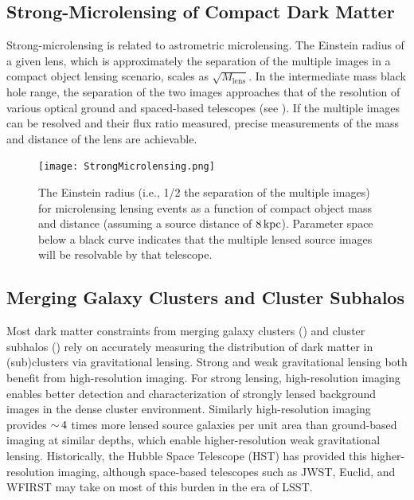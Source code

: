 \subsection{Strong-Microlensing of Compact Dark Matter }
Strong-microlensing is related to astrometric microlensing.
The Einstein radius of a given lens, which is approximately the separation of the multiple images in a compact object lensing scenario, scales as $\sqrt{M_\mathrm{lens}}$.
In the intermediate mass black hole range, the separation of the two images approaches that of the resolution of various optical ground and spaced-based telescopes (see ).
If the multiple images can be resolved and their flux ratio measured, precise measurements of the mass and distance of the lens are achievable.

\begin{figure}
\label{fig:strong_microlensing}
\centering
\texttt{[image: StrongMicrolensing.png]}
\caption{The Einstein radius (i.e., 1/2 the separation of the multiple images) for microlensing lensing events as a function of compact object mass and distance (assuming a source distance of $8\mathrm{\,kpc}$). Parameter space below a black curve indicates that the multiple lensed source images will be resolvable by that telescope.}
\end{figure}

\subsection{Merging Galaxy Clusters and Cluster Subhalos}

Most dark matter constraints from merging galaxy clusters () and cluster subhalos () rely on accurately measuring the distribution of dark matter in (sub)clusters via gravitational lensing.
Strong and weak gravitational lensing both benefit from high-resolution imaging.
For strong lensing, high-resolution imaging enables better detection and characterization of strongly lensed background images in the dense cluster environment.
Similarly high-resolution imaging provides $ {\sim}\,4$ times more lensed source galaxies per unit area than ground-based imaging at similar depths, which enable higher-resolution weak gravitational lensing.
Historically, the Hubble Space Telescope (HST) has provided this higher-resolution imaging, although space-based telescopes such as JWST, Euclid, and WFIRST may take on most of this burden in the era of LSST.


